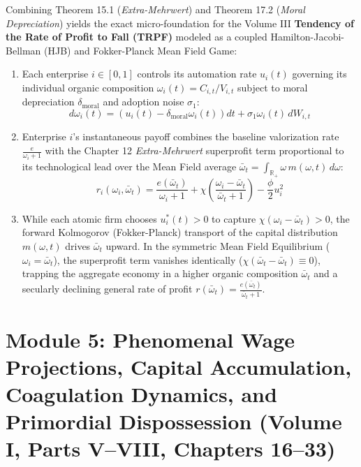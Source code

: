 \documentclass[11pt,a4paper]{article}
\begin{document}
Combining Theorem 15.1 (\textit{Extra-Mehrwert}) and Theorem 17.2 (\textit{Moral Depreciation}) yields the exact micro-foundation for the Volume III \textbf{Tendency of the Rate of Profit to Fall (TRPF)} modeled as a coupled Hamilton-Jacobi-Bellman (HJB) and Fokker-Planck Mean Field Game:
\begin{enumerate}
    \item Each enterprise $i \in [0, 1]$ controls its automation rate $u_i(t)$ governing its individual organic composition $\omega_i(t) = C_{i,t}/V_{i,t}$ subject to moral depreciation $\delta_{\text{moral}}$ and adoption noise $\sigma_1$:
    \begin{equation}
        d\omega_i(t) = \left(u_i(t) - \delta_{\text{moral}} \omega_i(t)\right) dt + \sigma_1 \omega_i(t) \, dW_{i,t}
    \end{equation}
    \item Enterprise $i$'s instantaneous payoff combines the baseline valorization rate $\frac{e}{\omega_i + 1}$ with the Chapter 12 \textit{Extra-Mehrwert} superprofit term proportional to its technological lead over the Mean Field average $\bar{\omega}_t = \int_{\mathbb{R}_+} \omega \, m(\omega, t) \, d\omega$:
    \begin{equation}
        r_i(\omega_i, \bar{\omega}_t) = \frac{e(\bar{\omega}_t)}{\omega_i + 1} + \chi \left(\frac{\omega_i - \bar{\omega}_t}{\bar{\omega}_t + 1}\right) - \frac{\phi}{2} u_i^2
    \end{equation}
    \item While each atomic firm chooses $u_i^*(t) > 0$ to capture $\chi(\omega_i - \bar{\omega}_t) > 0$, the forward Kolmogorov (Fokker-Planck) transport of the capital distribution $m(\omega, t)$ drives $\bar{\omega}_t$ upward. In the symmetric Mean Field Equilibrium ($\omega_i = \bar{\omega}_t$), the superprofit term vanishes identically ($\chi(\bar{\omega}_t - \bar{\omega}_t) \equiv 0$), trapping the aggregate economy in a higher organic composition $\bar{\omega}_t$ and a secularly declining general rate of profit $r(\bar{\omega}_t) = \frac{e(\bar{\omega}_t)}{\bar{\omega}_t + 1}$.
\end{enumerate}
\newpage

\part{Module 5: Phenomenal Wage Projections, Capital Accumulation, Coagulation Dynamics, and Primordial Dispossession (Volume I, Parts V--VIII, Chapters 16--33)}
\end{document}
